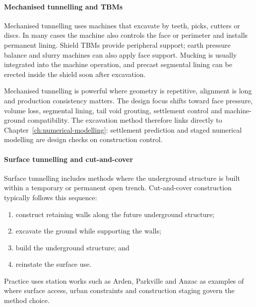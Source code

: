 \paragraph{Mechanised tunnelling and TBMs}
\label{sec:mechanised-tunnelling}
Mechanised tunnelling uses machines that excavate by teeth, picks, cutters or discs. In many cases the machine also controls the face or perimeter and installs permanent lining. Shield TBMs provide peripheral support; earth pressure balance and slurry machines can also apply face support. Mucking is usually integrated into the machine operation, and precast segmental lining can be erected inside the shield soon after excavation.

Mechanised tunnelling is powerful where geometry is repetitive, alignment is long and production consistency matters. The design focus shifts toward face pressure, volume loss, segmental lining, tail void grouting, settlement control and machine-ground compatibility. The excavation method therefore links directly to Chapter~\ref{ch:numerical-modelling}: settlement prediction and staged numerical modelling are design checks on construction control.

\paragraph{Surface tunnelling and cut-and-cover}
\label{sec:cut-and-cover}
Surface tunnelling includes methods where the underground structure is built within a temporary or permanent open trench. Cut-and-cover construction typically follows this sequence:
\begin{enumerate}
 \item construct retaining walls along the future underground structure;
 \item excavate the ground while supporting the walls;
 \item build the underground structure; and
 \item reinstate the surface use.
\end{enumerate}
Practice uses station works such as Arden, Parkville and Anzac as examples of where surface access, urban constraints and construction staging govern the method choice.

